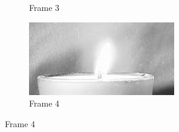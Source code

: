 \documentclass{article}
\begin{document}
\begin{enumerate}
\begin{figure}[h!]
\begin{subfigure}{0.24\textwidth}
        \caption{Frame 3}
    \end{subfigure}
    \begin{subfigure}{0.24\textwidth}
        \centering
        \includegraphics[width=\linewidth]{../images/flame/frame = 4.png}
        \caption{Frame 4}
    \end{subfigure}


\end{figure}
\end{enumerate}
\end{document}

